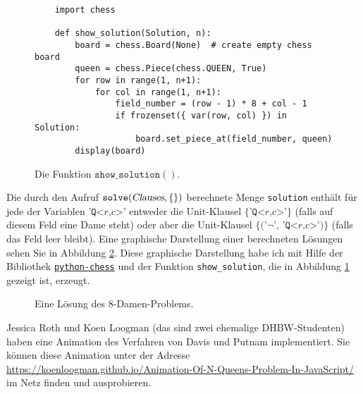 \begin{figure}[!ht]
\centering
\begin{verbatim}
    import chess
                
    def show_solution(Solution, n):
        board = chess.Board(None)  # create empty chess board
        queen = chess.Piece(chess.QUEEN, True)
        for row in range(1, n+1):
            for col in range(1, n+1):
                field_number = (row - 1) * 8 + col - 1
                if frozenset({ var(row, col) }) in Solution:
                    board.set_piece_at(field_number, queen)
        display(board)        
\end{verbatim}
\vspace*{-0.3cm}
\caption{Die Funktion $\texttt{show\_solution}()$.}
\label{fig:printBoard}
\end{figure}



Die durch den Aufruf $\texttt{solve}(\textsl{Clauses}, \{\})$ 
berechnete Menge \texttt{solution} enthält für jede der Variablen $\texttt{'Q<}r\texttt{,}c\texttt{>'}$
entweder die Unit-Klausel $\{\texttt{'Q<}r\texttt{,}c\texttt{>'}\}$  (falls auf diesem Feld eine Dame steht) oder
aber die Unit-Klausel  $\{ \texttt{('¬', 'Q<}r\texttt{,}c\texttt{>')}\}$ (falls das Feld leer bleibt).
Eine graphische Darstellung einer berechneten Lösungen sehen Sie in Abbildung \ref{fig:8-queens.pdf}.
Diese graphische Darstellung habe ich mit Hilfe der Bibliothek
\href{https://python-chess.readthedocs.io/en/latest/}{\texttt{python-chess}} und der Funktion
\texttt{show\_solution}, die in Abbildung \ref{fig:printBoard} gezeigt ist, erzeugt.

\begin{figure}[!ht]
  \centering
  \caption{Eine Lösung des 8-Damen-Problems.}
  \label{fig:8-queens.pdf}
\end{figure}

Jessica Roth und Koen Loogman (das sind zwei ehemalige DHBW-Studenten) haben eine Animation des Verfahren von
Davis und Putnam implementiert.  Sie können diese Animation unter der Adresse
\\[0.2cm]
\hspace*{1.3cm}
\href{https://koenloogman.github.io/Animation-Of-N-Queens-Problem-In-JavaScript/}{https://koenloogman.github.io/Animation-Of-N-Queens-Problem-In-JavaScript/}
\\[0.2cm]
im Netz finden und ausprobieren.

